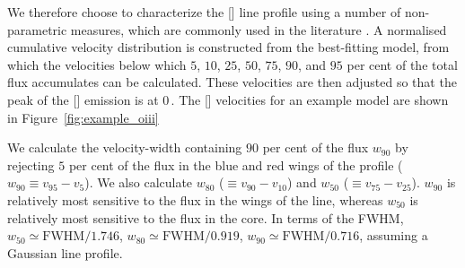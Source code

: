 We therefore choose to characterize the [] line profile using a number of non-parametric measures, which are commonly used in the literature \citep[e.g.][]{whittle85,zakamska14,zakamska16}. 
A normalised cumulative velocity distribution is constructed from the best-fitting model, from which the velocities below which $5$, $10$, $25$, $50$, $75$, $90$, and $95$ per cent of the total flux accumulates can be calculated. 
These velocities are then adjusted so that the peak of the [] emission is at $0$\,\kms. 
The [] velocities for an example model are shown in Figure~\ref{fig:example_oiii} 

We calculate the velocity-width containing $90$ per cent of the flux $w_{90}$ by rejecting $5$ per cent of the flux in the blue and red wings of the profile ($w_{90}\equiv v_{95} - v_{5}$).
We also calculate $w_{80}$ ($\equiv v_{90} - v_{10}$) and $w_{50}$ ($\equiv v_{75} - v_{25}$).
$w_{90}$ is relatively most sensitive to the flux in the wings of the line, whereas $w_{50}$ is relatively most sensitive to the flux in the core.  
In terms of the FWHM, $w_{50} \simeq \text{FWHM} / 1.746$, $w_{80} \simeq \text{FWHM} / 0.919$, $w_{90} \simeq \text{FWHM} / 0.716$, assuming a Gaussian line profile.  


